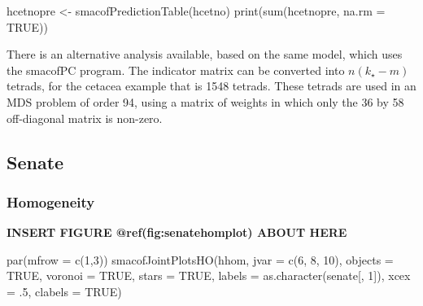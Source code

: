 \documentclass[
  12pt,
  letterpaper,
  DIV=11,
  numbers=noendperiod]{scrartcl}
\newenvironment{Shaded}{\begin{snugshade}}{\end{snugshade}}
\newcommand{\AttributeTok}[1]{\textcolor[rgb]{0.40,0.45,0.13}{#1}}
\newcommand{\ConstantTok}[1]{\textcolor[rgb]{0.56,0.35,0.01}{#1}}
\newcommand{\DecValTok}[1]{\textcolor[rgb]{0.68,0.00,0.00}{#1}}
\newcommand{\FunctionTok}[1]{\textcolor[rgb]{0.28,0.35,0.67}{#1}}
\newcommand{\NormalTok}[1]{\textcolor[rgb]{0.00,0.23,0.31}{#1}}
\newcommand{\OtherTok}[1]{\textcolor[rgb]{0.00,0.23,0.31}{#1}}
\begin{document}
\begin{Shaded}
\begin{Highlighting}[]
\NormalTok{hcetnopre }\OtherTok{\textless{}{-}} \FunctionTok{smacofPredictionTable}\NormalTok{(hcetno)}
\FunctionTok{print}\NormalTok{(}\FunctionTok{sum}\NormalTok{(hcetnopre, }\AttributeTok{na.rm =} \ConstantTok{TRUE}\NormalTok{))}
\end{Highlighting}
\end{Shaded}

There is an alternative analysis available, based on the same model,
which uses the smacofPC program. The indicator matrix can be converted
into \(n(k_\star-m)\) tetrads, for the cetacea example that is 1548
tetrads. These tetrads are used in an MDS problem of order 94, using a
matrix of weights in which only the 36 by 58 off-diagonal matrix is
non-zero.

\subsection{Senate}\label{senate}

\subsubsection{Homogeneity}\label{homogeneity-2}

\begin{greybox}

\begin{center}
\textbf{INSERT FIGURE @ref(fig:senatehomplot) ABOUT HERE}

\end{center}

\end{greybox}

\begin{Shaded}
\begin{Highlighting}[]
\FunctionTok{par}\NormalTok{(}\AttributeTok{mfrow =} \FunctionTok{c}\NormalTok{(}\DecValTok{1}\NormalTok{,}\DecValTok{3}\NormalTok{))}
\FunctionTok{smacofJointPlotsHO}\NormalTok{(hhom, }\AttributeTok{jvar =} \FunctionTok{c}\NormalTok{(}\DecValTok{6}\NormalTok{, }\DecValTok{8}\NormalTok{, }\DecValTok{10}\NormalTok{), }\AttributeTok{objects =} \ConstantTok{TRUE}\NormalTok{, }\AttributeTok{voronoi =} \ConstantTok{TRUE}\NormalTok{, }\AttributeTok{stars =} \ConstantTok{TRUE}\NormalTok{, }\AttributeTok{labels =} \FunctionTok{as.character}\NormalTok{(senate[, }\DecValTok{1}\NormalTok{]), }\AttributeTok{xcex =}\NormalTok{ .}\DecValTok{5}\NormalTok{, }\AttributeTok{clabels =} \ConstantTok{TRUE}\NormalTok{)}
\end{Highlighting}
\end{Shaded}
\end{document}
